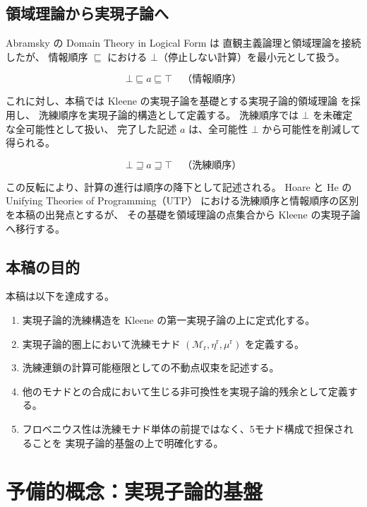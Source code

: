 \documentclass[11pt,a4paper]{article}
\theoremstyle{definition}
\newcommand{\Mr}{\mathcal{M}_{\mathrm{r}}}
\newcommand{\etar}{\eta^{\mathrm{r}}}
\newcommand{\mur}{\mu^{\mathrm{r}}}
\begin{document}
\subsection{領域理論から実現子論へ}

Abramsky \cite{Abramsky1991} の Domain Theory in Logical Form は
直観主義論理と領域理論を接続したが、
情報順序 $\sqsubseteq$ における $\bot$（停止しない計算）を最小元として扱う。

\begin{equation}
\bot \sqsubseteq a \sqsubseteq \top \quad \text{（情報順序）}
\end{equation}

これに対し、本稿では Kleene の実現子論を基礎とする実現子論的領域理論
\cite{Bauer2000,Escardo2004,Birkedal2000} を採用し、
洗練順序を実現子論的構造として定義する。
洗練順序では $\bot$ を未確定な全可能性として扱い、
完了した記述 $a$ は、全可能性 $\bot$ から可能性を削減して得られる。

\begin{equation}
\bot \sqsupseteq a \sqsupseteq \top \quad \text{（洗練順序）}
\end{equation}

この反転により、計算の進行は順序の降下として記述される。
Hoare と He \cite{Hoare1998} の Unifying Theories of Programming（UTP）
における洗練順序と情報順序の区別を本稿の出発点とするが、
その基礎を領域理論の点集合から Kleene の実現子論へ移行する。

\subsection{本稿の目的}

本稿は以下を達成する。

\begin{enumerate}
\item 実現子論的洗練構造を Kleene の第一実現子論の上に定式化する。
\item 実現子論的圏上において洗練モナド $(\Mr,\etar,\mur)$ を定義する。
\item 洗練連鎖の計算可能極限としての不動点収束を記述する。
\item 他のモナドとの合成において生じる非可換性を実現子論的残余として定義する。
\item フロベニウス性は洗練モナド単体の前提ではなく、5モナド構成で担保されることを
  実現子論的基盤の上で明確化する。
\end{enumerate}

\section{予備的概念：実現子論的基盤}
\end{document}
